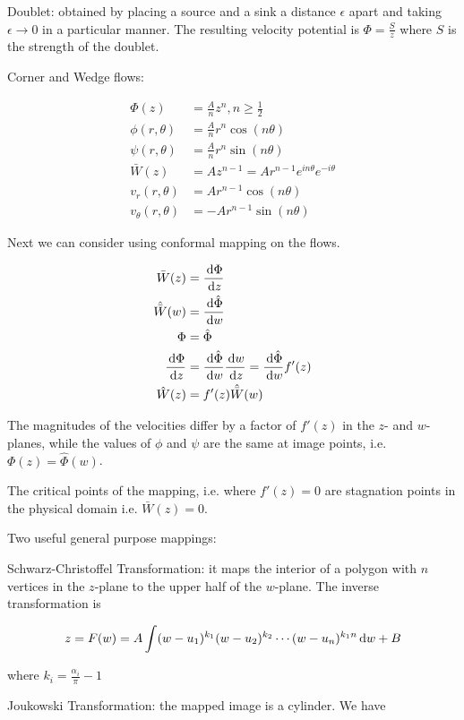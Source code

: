 \documentclass{article}
\begin{document}
Doublet: obtained by placing a source and a sink a distance \(\epsilon\) apart and taking \(\epsilon \to 0\) in a particular manner. The resulting velocity potential is \(\Phi = \frac{S}{z}\) where \(S\) is the strength of the doublet.

Corner and Wedge flows: 

\begin{align*}
    \Phi(z) &= \frac{A}{n}z^n, n\geq \frac{1}{2}\\
    \phi(r,\theta) &= \frac{A}{n} r^n \cos(n\theta)\\
    \psi(r,\theta) &= \frac{A}{n} r^n \sin(n\theta)\\
    \bar W(z) &= Az^{n-1} = Ar^{n-1} e^{in\theta}e^{-i\theta}\\
    v_r(r,\theta) &= Ar^{n-1} \cos(n\theta)\\
    v_\theta(r,\theta) &=- Ar^{n-1} \sin(n\theta)
\end{align*}

Next we can consider using conformal mapping on the flows.

\begin{align*}
    \bar W(z) &= \frac{\,\mathrm{d}\Phi}{\,\mathrm{d} z}\\
    \hat{\bar W}(w) &= \frac{\,\mathrm{d} \hat \Phi}{\,\mathrm{d} w}\\
    \Phi&=\hat\Phi\\
    \frac{\,\mathrm{d}\Phi}{\,\mathrm{d} z} &= \frac{\,\mathrm{d} \hat\Phi}{\,\mathrm{d} w}\frac{\,\mathrm{d} w}{\,\mathrm{d} z} = \frac{\,\mathrm{d} \hat\Phi}{\,\mathrm{d} w} f'(z)\\
    \hat W(z) &= f'(z) \hat{\bar W}(w)
\end{align*}

The magnitudes of the velocities differ by a factor of \(f'(z)\) in the \(z\)- and \(w\)-planes, while the values of \(\phi\) and \(\psi\) are the same at image points, i.e. \(\Phi(z) = \hat\Phi(w)\).

The critical points of the mapping, i.e. where \(f'(z) = 0\) are stagnation points in the physical domain i.e. \(\bar W(z)=0\).

Two useful general purpose mappings:

Schwarz-Christoffel Transformation: it maps the interior of a polygon with \(n\) vertices in the \(z\)-plane to the upper half of the \(w\)-plane. The inverse transformation is

\[z=F(w)=A\int (w-u_1)^{k_1}(w-u_2)^{k_2}\cdots (w-u_n)^{k_1n}\,\mathrm{d} w+B\]

where \(k_i=\frac{\alpha_i}{\pi}-1\)

Joukowski Transformation: the mapped image is a cylinder. We have
\end{document}

